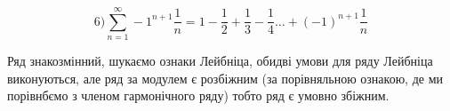 







$$
6) \sum_{n=1}^\infty -1^{n+1}\dfrac{1}{n} = 1 - \dfrac{1}{2} + \dfrac{1}{3} - \dfrac{1}{4} \ldots + (-1)^{n+1} \dfrac{1}{n}
$$

Ряд знакозмінний, шукаємо ознаки Лейбніца, обидві умови для ряду Лейбніца виконуються, але ряд за модулем є розбіжним (за порівняльною ознакою, де ми порівнбємо з членом гармонічного ряду) тобто ряд є умовно збіжним.

